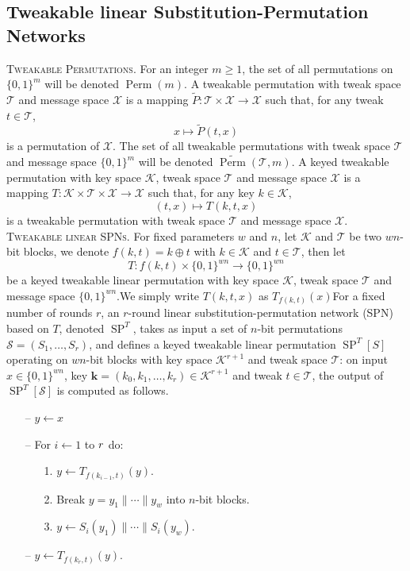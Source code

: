 \subsection{Tweakable linear Substitution-Permutation Networks}
\textsc{Tweakable Permutations.} For an integer $m \geq 1$, the set of all permutations
on $\{0,1\}^{m}$ will be denoted $\operatorname{Perm}(m)$. A tweakable permutation with tweak space $\mathcal{T}$ and message space $\mathcal{X}$ is a mapping $\widetilde{P} :\mathcal{T} \times \mathcal{X} \rightarrow \mathcal{X}$ such that, for any tweak $t \in \mathcal{T}$,
$$
x \mapsto \widetilde{P}(t,x)
$$
\noindent is a permutation of $\mathcal{X}$. The set of all tweakable permutations with tweak space $\mathcal{T}$ and message space $\{0,1\}^{m}$ will be denoted $\widetilde{\operatorname{Perm}}(\mathcal{T}, m)$.
A keyed tweakable permutation with key space $\mathcal{K}$, tweak space $\mathcal{T}$ and message space $\mathcal{X}$ is a mapping $T : \mathcal{K} \times \mathcal{T} \times \mathcal{X} \rightarrow \mathcal{X}$ such that, for any key $k \in \mathcal{K}$,
$$
(t,x) \mapsto T(k,t,x)
$$
\noindent is a tweakable permutation with tweak space $\mathcal{T}$ and message space $\mathcal{X}$.\\

\textsc{Tweakable linear SPNs.} For fixed parameters $w$ and $n$, let $\mathcal{K}$ and $\mathcal{T}$ be two $w n$-bit blocks, we denote $f(k, t) = k \oplus t$ with $k \in \mathcal{K}$ and $t \in \mathcal{T}$, then let
$$
T: f(k, t) \times \{0,1\}^{w n} \rightarrow \{0,1\}^{w n}
$$
be a keyed tweakable linear permutation with key space $\mathcal{K}$, tweak space $\mathcal{T}$ and message space $\{0,1\}^{w n}$.We simply write $T(k,t,x)$ as $T_{f(k, t)}(x)$For a fixed number of rounds $r$, an $r$-round linear substitution-permutation network (SPN) based on $T$, denoted $\operatorname{SP}^T$, takes as input a set of $n$-bit permutations $\mathcal{S} = (S_1, \ldots, S_r)$, and defines a keyed tweakable  linear permutation $\operatorname{SP}^{T}[S]$ operating on $w n$-bit blocks with key space $\mathcal{K}^{r+1}$ and tweak space $\mathcal{T}$: on input $x \in \{0,1\}^{w n}$, key $\mathbf{k} = (k_0, k_1, \ldots, k_r) \in \mathcal{K}^{r+1}$ and tweak $t \in \mathcal{T}$, the output of $\operatorname{SP}^T[\mathcal{S}]$ is computed as follows.

\begin{itemize}
	\item[--]
	$y \leftarrow x$
	\item[--]
	For $i \leftarrow 1$ to $\mathnormal{r}$ do:
	\begin{itemize}
		\item[1.]
		$y \leftarrow T_{f(k_{i-1}, t)}(y)$.
		\item[2.]
		Break $y = y_1 \| \cdots \| y_w$ into $n$-bit blocks.
		\item[3.]
		$y \leftarrow S_i(y_1) \| \cdots \| S_i(y_w)$.
	\end{itemize}
	\item[--]
	$y \leftarrow T_{f(k_{r}, t)}(y)$.
\end{itemize}


